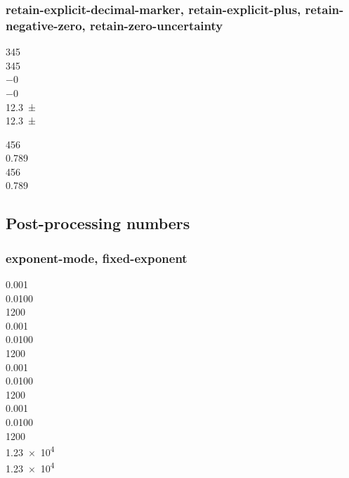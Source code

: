 \documentclass{article}
\begin{document}

\subsubsection{retain-explicit-decimal-marker, retain-explicit-plus, retain-negative-zero, retain-zero-uncertainty}
\num{+345} \\
\num[retain-explicit-plus]{+345} \\
\num{-0} \\
\num[retain-negative-zero]{-0} \\
\num{12.3(0)} \\
\num[retain-zero-uncertainty]{12.3(0)}

{
\num{456} \\
\num{.789} \\
%
\num{456} \\
\num{.789} %
}

\subsection{Post-processing numbers}

\subsubsection{exponent-mode, fixed-exponent}
{
\num{0.001} \\
\num{0.0100} \\
\num{1200} \\
%
\num{0.001} \\
\num{0.0100} \\
\num{1200} \\
%
\num{0.001} \\
\num{0.0100} \\
\num{1200} \\
%
\num{0.001} \\
\num{0.0100} \\
\num{1200} \\
}
\num{1.23e4} \\
\num[exponent-mode = fixed, fixed-exponent = 0]{1.23e4}
\end{document}
